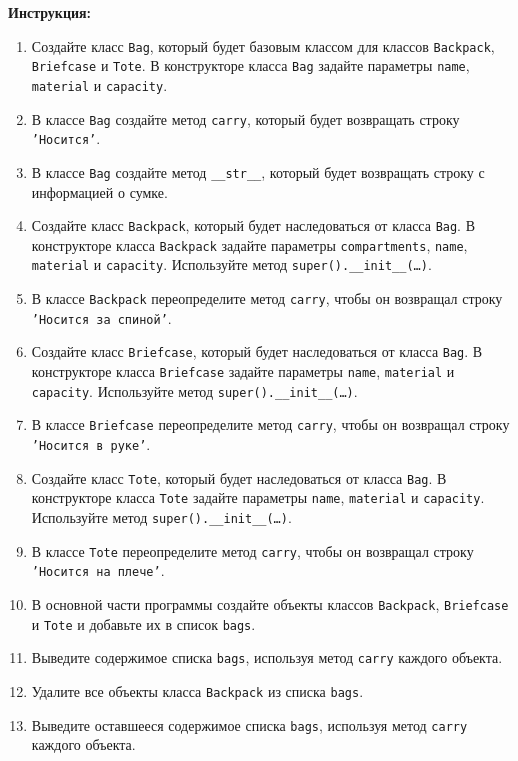 \begin{enumerate}
\textbf{Инструкция:}
\begin{enumerate}
    \item Создайте класс \texttt{Bag}, который будет базовым классом для классов \texttt{Backpack}, \texttt{Briefcase} и \texttt{Tote}. В конструкторе класса \texttt{Bag} задайте параметры \texttt{name}, \texttt{material} и \texttt{capacity}.
    \item В классе \texttt{Bag} создайте метод \texttt{carry}, который будет возвращать строку \texttt{'Носится'}.
    \item В классе \texttt{Bag} создайте метод \texttt{\_\_str\_\_}, который будет возвращать строку с информацией о сумке.
    \item Создайте класс \texttt{Backpack}, который будет наследоваться от класса \texttt{Bag}. В конструкторе класса \texttt{Backpack} задайте параметры \texttt{compartments}, \texttt{name}, \texttt{material} и \texttt{capacity}. Используйте метод \texttt{super().\_\_init\_\_(\ldots)}.
    \item В классе \texttt{Backpack} переопределите метод \texttt{carry}, чтобы он возвращал строку \texttt{'Носится за спиной'}.
    \item Создайте класс \texttt{Briefcase}, который будет наследоваться от класса \texttt{Bag}. В конструкторе класса \texttt{Briefcase} задайте параметры \texttt{name}, \texttt{material} и \texttt{capacity}. Используйте метод \texttt{super().\_\_init\_\_(\ldots)}.
    \item В классе \texttt{Briefcase} переопределите метод \texttt{carry}, чтобы он возвращал строку \texttt{'Носится в руке'}.
    \item Создайте класс \texttt{Tote}, который будет наследоваться от класса \texttt{Bag}. В конструкторе класса \texttt{Tote} задайте параметры \texttt{name}, \texttt{material} и \texttt{capacity}. Используйте метод \texttt{super().\_\_init\_\_(\ldots)}.
    \item В классе \texttt{Tote} переопределите метод \texttt{carry}, чтобы он возвращал строку \texttt{'Носится на плече'}.
    \item В основной части программы создайте объекты классов \texttt{Backpack}, \texttt{Briefcase} и \texttt{Tote} и добавьте их в список \texttt{bags}.
    \item Выведите содержимое списка \texttt{bags}, используя метод \texttt{carry} каждого объекта.
    \item Удалите все объекты класса \texttt{Backpack} из списка \texttt{bags}.
    \item Выведите оставшееся содержимое списка \texttt{bags}, используя метод \texttt{carry} каждого объекта.

\end{enumerate}
\end{enumerate}
